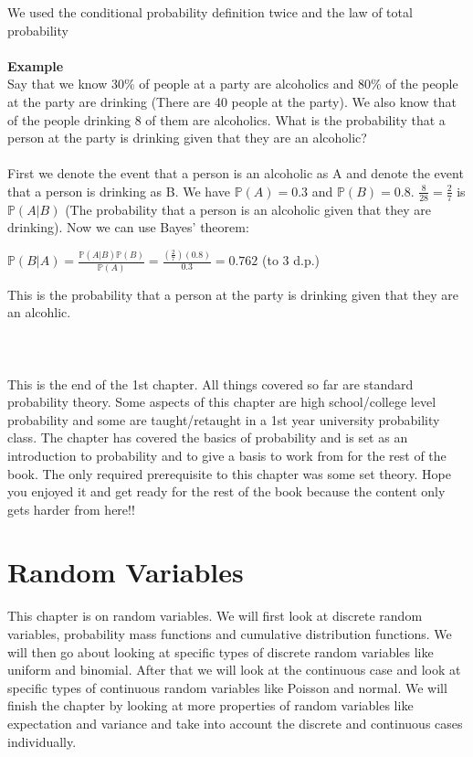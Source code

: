 \documentclass[,oneside]{article}
\begin{document}
\begin{enumerate}
We used the conditional probability definition twice and the law of total probability \\
\\ \textbf{Example}\\
Say that we know 30\% of people at a party are alcoholics and 80\% of the people at the party are drinking (There are 40 people at the party). We also know that of the people drinking 8 of them are alcoholics. What is the probability that a person at the party is drinking given that they are an alcoholic?\\
\\First we denote the event that a person is an alcoholic as A and denote the event that a person is drinking as B. We have $\mathbb{P}(A)=0.3$ and $\mathbb{P}(B)=0.8$. $\frac{8}{28}=\frac{2}{7}$ is $\mathbb{P}(A|B)$ (The probability that a person is an alcoholic given that they are drinking). Now we can use Bayes' theorem:\\
\begin{center}
$\mathbb{P}(B|A)=\frac{\mathbb{P}(A|B)\mathbb{P}(B)}{\mathbb{P}(A)}=\frac{(\frac{2}{7})(0.8)}{0.3}=0.762$ (to 3 d.p.)
\end{center}
This is the probability that a person at the party is drinking given that they are an alcohlic.\\ \\ \\
\\This is the end of the 1st chapter. All things covered so far are standard probability theory. Some aspects of this chapter are high school/college level probability and some are taught/retaught in a 1st year university probability class. The chapter has covered the basics of probability and is set as an introduction to probability and to give a basis to work from for the rest of the book. The only required prerequisite to this chapter was some set theory. Hope you enjoyed it and get ready for the rest of the book because the content only gets harder from here!!
\pagebreak
\section{Random Variables}
This chapter is on random variables. We will first look at discrete random variables, probability mass functions and cumulative distribution functions. We will then go about looking at specific types of discrete random variables like uniform and binomial. After that we will look at the continuous case and look at specific types of continuous random variables like Poisson and normal. We will finish the chapter by looking at more properties of random variables like expectation and variance and take into account the discrete and continuous cases individually. 

\end{enumerate}
\end{document}
